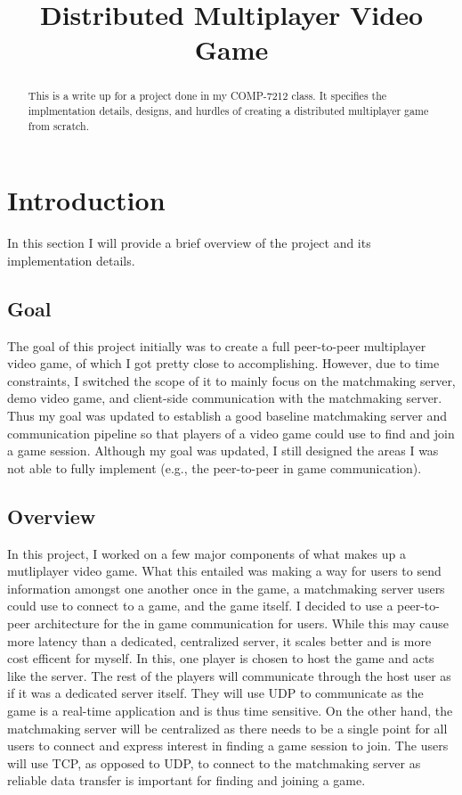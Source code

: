 \documentclass[conference]{IEEEtran}
\begin{document}
\title{Distributed Multiplayer Video Game}

\author{
}

\maketitle

\begin{abstract}
This is a write up for a project done in my COMP-7212 class.
It specifies the implmentation details, designs, and hurdles of creating a distributed multiplayer game from scratch.
\end{abstract}

\section{Introduction}
In this section I will provide a brief overview of the project and its implementation details.

\subsection{Goal}
The goal of this project initially was to create a full peer-to-peer multiplayer video game, of which I got pretty close to accomplishing.
However, due to time constraints, I switched the scope of it to mainly focus on the matchmaking server, demo video game, and client-side communication with the matchmaking server.
Thus my goal was updated to establish a good baseline matchmaking server and communication pipeline so that players of a video game could use to find and join a game session.
Although my goal was updated, I still designed the areas I was not able to fully implement (e.g., the peer-to-peer in game communication).

\subsection{Overview}
In this project, I worked on a few major components of what makes up a mutliplayer video game.
What this entailed was making a way for users to send information amongst one another once in the game, a matchmaking server users could use to connect to a game, and the game itself.
I decided to use a peer-to-peer architecture for the in game communication for users. 
While this may cause more latency than a dedicated, centralized server, it scales better and is more cost efficent for myself.
In this, one player is chosen to host the game and acts like the server.
The rest of the players will communicate through the host user as if it was a dedicated server itself.
They will use UDP to communicate as the game is a real-time application and is thus time sensitive.
On the other hand, the matchmaking server will be centralized as there needs to be a single point for all users to connect and express interest in finding a game session to join.
The users will use TCP, as opposed to UDP, to connect to the matchmaking server as reliable data transfer is important for finding and joining a game.
\end{document}
